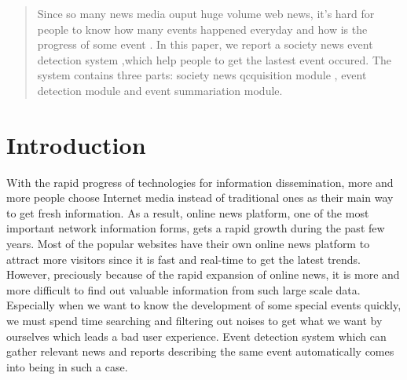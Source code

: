 \documentclass[conference]{IEEEtran}
\begin{document}

\maketitle


\begin{abstract}
Since so many news media ouput huge volume web news, it's hard for people to know how many events happened everyday and how is the progress of some event . In this paper, we report a society news event detection system ,which help people to get the lastest event occured. The system contains three parts: society news qcquisition module , event detection module and event summariation module.
\end{abstract}





%
\IEEEpeerreviewmaketitle

\section{Introduction}
With the rapid progress of technologies for information dissemination, more and more people choose Internet media instead of traditional ones as their main way to get fresh information. As a result, online news platform, one of the most important network information forms, gets a rapid growth during the past few years. Most of the popular websites have their own online news platform to attract more visitors since it is fast and real-time to get the latest trends. However, preciously because of the rapid expansion of online news, it is more and more difficult to find out valuable information from such large scale data. Especially when we want to know the development of some special events quickly, we must spend time searching and filtering out noises to get what we want by ourselves which leads a bad user experience. Event detection system which can gather relevant news and reports describing the same event automatically comes into being in such a case.
\end{document}
